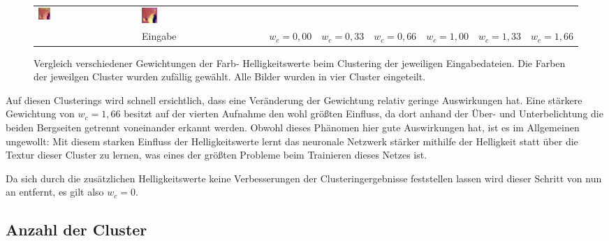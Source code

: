 \begin{figure}[h!]
\begin{tabular}{m{15pt}m{}m{}m{}m{}m{}m{}m{}}
		\includegraphics[width=0.13\textwidth]{images/gen/color_weight/p03_04.png_1.33.png} &
		\includegraphics[width=0.13\textwidth]{images/gen/color_weight/p03_04.png_1.66.png} \\
		
		&
		\vspace*{2pt}\centering Eingabe & 
		\vspace*{2pt}\centering $w_c=0,00$ &
		\vspace*{2pt}\centering $w_c=0,33$ &
		\vspace*{2pt}\centering $w_c=0,66$ &
		\vspace*{2pt}\centering $w_c=1,00$ &
		\vspace*{2pt}\centering $w_c=1,33$ &
		\vspace*{2pt}\centering $w_c=1,66$
	\end{tabular}
	\caption{Vergleich verschiedener Gewichtungen der Farb- \bzw Helligkeitswerte beim Clustering der jeweiligen Eingabedateien. Die Farben der jeweilgen Cluster wurden zufällig gewählt. Alle Bilder wurden in vier Cluster eingeteilt.}
	\label{fig:filterbank_weights_col}
\end{figure}

Auf diesen Clusterings wird schnell ersichtlich, dass eine Veränderung der Gewichtung relativ geringe Auswirkungen hat. Eine stärkere Gewichtung von $w_c=1,66$ besitzt auf der vierten Aufnahme den wohl größten Einfluss, da dort anhand der Über- und Unterbelichtung die beiden Bergseiten getrennt voneinander erkannt werden. Obwohl dieses Phänomen hier gute Auswirkungen hat, ist es im Allgemeinen ungewollt: Mit diesem starken Einfluss der Helligkeitswerte lernt das neuronale Netzwerk stärker mithilfe der Helligkeit statt über die Textur dieser Cluster zu lernen, was eines der größten Probleme beim Trainieren dieses Netzes ist.

Da sich durch die zusätzlichen Helligkeitswerte keine Verbesserungen der Clusteringergebnisse feststellen lassen wird dieser Schritt von nun an entfernt, es gilt also $w_c=0$.

\subsection{Anzahl der Cluster}
\label{ssec:exp_number_of_segments}


